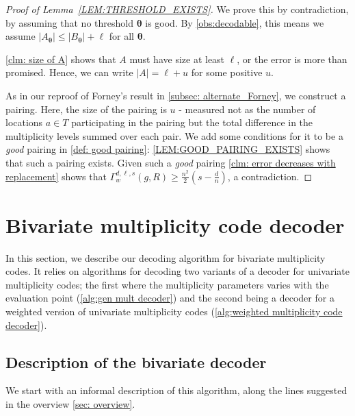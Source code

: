 \documentclass{theoretics}
\def\abs#1{\left| #1 \right|}
\newcommand{\thetabar}{{\boldsymbol{\theta}}}
\begin{document}
	\begin{proof}[Proof of Lemma~\ref{LEM:THRESHOLD_EXISTS}]
		We prove this by contradiction, by assuming that no threshold $\thetabar$ is good. By \autoref{obs:decodable}, this means we assume $\abs{A_{\thetabar}} \leq \abs{B_{\thetabar}} + \ell$ for all $\thetabar$.
		
		
		\autoref{clm: size of A} shows that $A$ must have size at least $\ell$, or the error is more than promised. Hence, we can write $\abs{A} = \ell + u$ for some positive $u$. 
		
		As in our reproof of Forney's result in \cref{subsec: alternate_Forney}, we construct a pairing. Here, the size of the pairing is $u$ - measured not as the number of locations $a\in T$ participating in the pairing  but the total difference in the multiplicity levels summed over each pair. We add some conditions for it to be a \emph{good} pairing in \autoref{def: good pairing}: \autoref{LEM:GOOD_PAIRING_EXISTS} shows that such a pairing exists. 
		Given such a \emph{good} pairing \autoref{clm: error decreases with replacement} shows that  $\Gamma_w^{d, \ell, s}(g, R) \geq \frac{n^2}{2}(s-\frac{d}{n})$, a contradiction.
	\end{proof}
	
	
	\section{Bivariate multiplicity code decoder}
	\label{sec:bivariate}
	
	In this section, we describe our decoding
	algorithm for bivariate multiplicity codes. It relies on
	algorithms for decoding two variants of a decoder for univariate
	multiplicity codes; the first where the multiplicity parameters varies
	with the evaluation point (\cref{alg:gen mult decoder}) and the second being a decoder for a
	weighted version of univariate multiplicity codes (\cref{alg:weighted multiplicity code decoder}). 
	
	\subsection{Description of the bivariate decoder}\label{sec:bivariate_decoder}
	
	We start with an informal description of this algorithm, along the
	lines suggested in the overview \cref{sec: overview}. 
	
\end{document}
